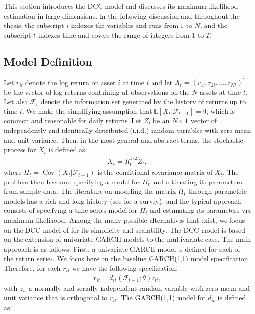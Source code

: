 This section introduces the DCC model and discusses its maximum likelihood estimation in large dimensions. In the following discussion and throughout the thesis, the subscript $i$ indexes the variables and runs from $1$ to $N$, and the subscript $t$ indexes time and covers the range of integers from $1$ to $T$.

\subsection{Model Definition}
Let $r_{it}$ denote the log return on asset $i$ at time $t$ and let $X_t = (r_{1t}, r_{2t}, \dots , r_{Nt})^\prime$ be the vector of log returns containing all observations on the $N$ assets at time $t$. Let also $\mathcal{F}_{t}$ denote the information set generated by the history of returns up to time $t$. We make the simplifying assumption that $\mathbb{E}[X_t \vert{} \mathcal{F}_{t-1}] = 0$, which is common and reasonable for daily returns. Let $Z_t$ be an $N \times 1$ vector of independently and identically distributed (i.i.d.) random variables with zero mean and unit variance. Then, in the most general and abstract terms, the stochastic process for $X_t$ is defined as:
\begin{align}
	X_t = H_t^{1/2} Z_t,
\end{align}
where $H_t = \operatorname{Cov}(X_t \vert{} \mathcal{F}_{t-1})$ is the conditional covariance matrix of $X_t$. The problem then becomes specifying a model for $H_t$ and estimating its parameters from sample data. The literature on modeling the matrix $H_t$ through parametric models has a rich and long history (see \textcite{BAUWENS} for a survey), and the typical approach consists of specifying a time-series model for $H_t$ and estimating its parameters via maximum likelihood. Among the many possible alternatives that exist, we focus on the DCC model of \textcite{ENGLE2002} for its simplicity and scalability. The DCC model is based on the extension of univariate GARCH models to the multivariate case. The main approach is as follows. First, a univariate GARCH model is defined for each of the return series. We focus here on the baseline GARCH(1,1) model specification. Therefore, for each $r_{it}$ we have the following specification:
\begin{align}
	r_{it} = d_{it}(\mathcal{F}_{t-1};\theta) z_{it},
\end{align}
with $z_{it}$ a normally and serially independent random variable with zero mean and unit variance that is orthogonal to $r_{it}$. The GARCH(1,1) model for $d_{it}$ is defined as:
